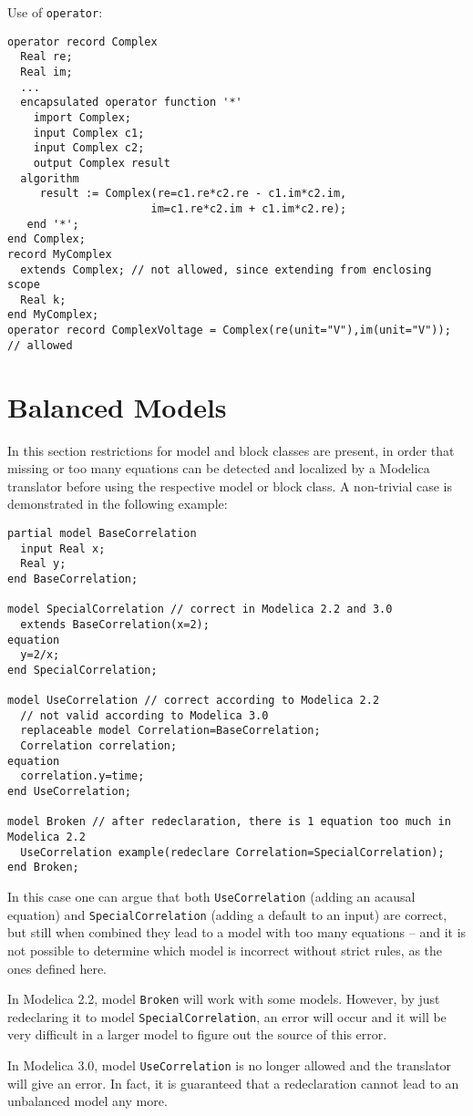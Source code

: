 \begin{example}
Use of \lstinline!operator!:
\begin{lstlisting}[language=modelica]
operator record Complex
  Real re;
  Real im;
  ...
  encapsulated operator function '*'
    import Complex;
    input Complex c1;
    input Complex c2;
    output Complex result
  algorithm
     result := Complex(re=c1.re*c2.re - c1.im*c2.im,
                      im=c1.re*c2.im + c1.im*c2.re);
   end '*';
end Complex;
record MyComplex
  extends Complex; // not allowed, since extending from enclosing scope
  Real k;
end MyComplex;
operator record ComplexVoltage = Complex(re(unit="V"),im(unit="V")); // allowed
\end{lstlisting}
\end{example}

\section{Balanced Models}

\begin{nonnormative}
In this section restrictions for model and block classes are
present, in order that missing or too many equations can be detected and
localized by a Modelica translator before using the respective model or
block class. A non-trivial case is demonstrated in the following
example:
\begin{lstlisting}[language=modelica]
partial model BaseCorrelation
  input Real x;
  Real y;
end BaseCorrelation;

model SpecialCorrelation // correct in Modelica 2.2 and 3.0
  extends BaseCorrelation(x=2);
equation
  y=2/x;
end SpecialCorrelation;

model UseCorrelation // correct according to Modelica 2.2
  // not valid according to Modelica 3.0
  replaceable model Correlation=BaseCorrelation;
  Correlation correlation;
equation
  correlation.y=time;
end UseCorrelation;

model Broken // after redeclaration, there is 1 equation too much in Modelica 2.2
  UseCorrelation example(redeclare Correlation=SpecialCorrelation);
end Broken;
\end{lstlisting}

In this case one can argue that both \lstinline!UseCorrelation! (adding
an acausal equation) and \lstinline!SpecialCorrelation! (adding a default to
an input) are correct, but still when combined they lead to a model with
too many equations -- and it is not possible to determine which model is
incorrect without strict rules, as the ones defined here.

In Modelica 2.2, model \lstinline!Broken! will work with some models.
However, by just redeclaring it to model \lstinline!SpecialCorrelation!, an
error will occur and it will be very difficult in a larger model to
figure out the source of this error.

In Modelica 3.0, model \lstinline!UseCorrelation! is no longer allowed
and the translator will give an error. In fact, it is guaranteed that a
redeclaration cannot lead to an unbalanced model any more.
\end{nonnormative}

